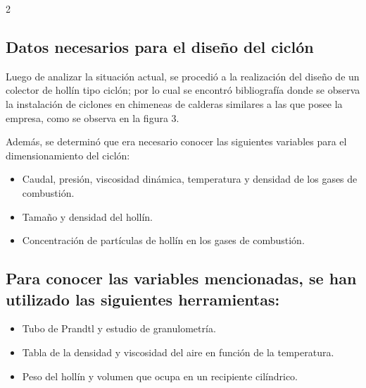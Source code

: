 \documentclass[12pt,spanish,Letterpaper,openany]{book}
\newcommand{\spacefivemilis}{\vspace{5mm}}
\begin{document}
\begin {multicols}{2}
\hypertarget{datos-necesarios-para-el-diseno-del-ciclon}{%
\subsection{Datos necesarios para el diseño del ciclón}\label{datos-necesarios-para-el-diseno-del-ciclon}}

Luego de analizar la situación actual, se procedió a la realización del diseño de un colector de hollín tipo ciclón; por lo cual se encontró bibliografía donde se observa la instalación de ciclones en chimeneas de calderas similares a las que posee la empresa, como se observa en la figura 3.

Además, se determinó que era necesario conocer las siguientes variables para el dimensionamiento del ciclón:

\spacefivemilis

\begin{itemize}
\item
  Caudal, presión, viscosidad dinámica, temperatura y densidad de los gases de combustión.
\item
  Tamaño y densidad del hollín.
\item
  Concentración de partículas de hollín en los gases de combustión.
\end{itemize}

\hypertarget{para-conocer-las-variables-mencionadas-se-han-utilizado-las-siguientes-herramientas}{%
\subsection{Para conocer las variables mencionadas, se han utilizado las siguientes herramientas:}\label{para-conocer-las-variables-mencionadas-se-han-utilizado-las-siguientes-herramientas}}

\begin{itemize}
\item
  Tubo de Prandtl y estudio de granulometría.
\item
  Tabla de la densidad y viscosidad del aire en función de la temperatura.
\item
  Peso del hollín y volumen que ocupa en un recipiente cilíndrico.
\end{itemize}

\begin {flushleft}
\noindent\begin{minipage}[c]{\columnwidth}

\centering


\end{minipage}
\end{flushleft}
\end{multicols}
\end{document}
